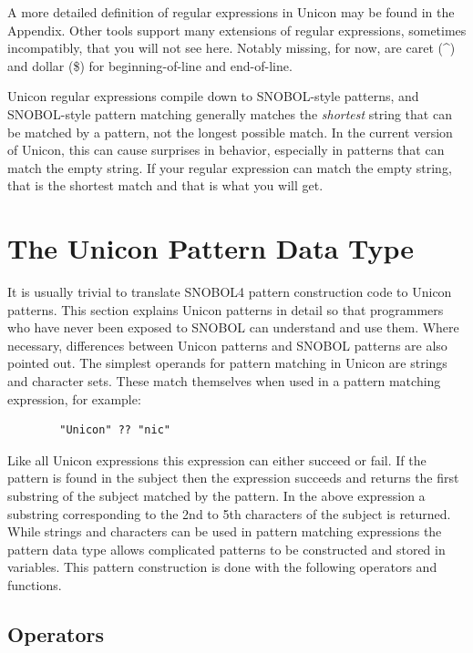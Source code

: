 \documentclass[letterpaper,12pt]{article}
\begin{document}
A more detailed definition of regular expressions in Unicon may be found
in the Appendix.  Other tools support many extensions of regular
expressions, sometimes incompatibly, that you will not see
here. Notably missing, for now, are caret (\^{}) and dollar (\$) for
beginning-of-line and end-of-line.

Unicon regular expressions compile down to SNOBOL-style patterns, and
SNOBOL-style pattern matching generally matches the {\em shortest\/}
string that can be matched by a pattern, not the longest possible
match.  In the current version of Unicon, this can cause surprises in
behavior, especially in patterns that can match the empty string. If
your regular expression can match the empty string, that is the
shortest match and that is what you will get.



\section{The Unicon Pattern Data Type}

It is usually trivial to translate
SNOBOL4 pattern construction code to Unicon patterns. This
section explains Unicon patterns in detail so that programmers who
have never been exposed to SNOBOL can understand and use them. Where
necessary, differences between Unicon patterns and SNOBOL patterns are
also pointed out.  The simplest operands for pattern matching in
Unicon are strings and character sets. These match themselves when
used in a pattern matching expression, for example:

\begin{verbatim}
        "Unicon" ?? "nic" 
\end{verbatim}

Like all Unicon expressions this expression can either succeed or
fail. If the pattern is found in the subject then the expression
succeeds and returns the first substring of the subject matched by the
pattern. In the above expression a substring corresponding to the 2nd
to 5th characters of the subject is returned. While strings and
characters can be used in pattern matching expressions the pattern
data type allows complicated patterns to be constructed and stored in
variables. This pattern construction is done with the following
operators and functions.

\subsection{Operators}
\end{document}
